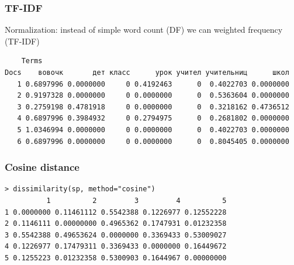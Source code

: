 \documentclass[svgnames]{beamer}
\begin{document}
\begin{frame}[fragile]
  \frametitle{TF-IDF}
  Normalization: instead of simple word count (DF) we can weighted frequency  (TF-IDF)
  \footnotesize
\begin{verbatim}
    Terms
Docs    вовочк       дет класс      урок учител учительниц      школ
   1 0.6897996 0.0000000     0 0.4192463      0  0.4022703 0.0000000
   2 0.9197328 0.0000000     0 0.0000000      0  0.5363604 0.0000000
   3 0.2759198 0.4781918     0 0.0000000      0  0.3218162 0.4736512
   4 0.6897996 0.3984932     0 0.2794975      0  0.2681802 0.0000000
   5 1.0346994 0.0000000     0 0.0000000      0  0.4022703 0.0000000
   6 0.6897996 0.0000000     0 0.0000000      0  0.8045405 0.0000000
\end{verbatim}
\end{frame}

\begin{frame}[fragile]
  \frametitle{Cosine distance}

  \footnotesize
\begin{verbatim}
> dissimilarity(sp, method="cosine")
          1          2         3         4          5
1 0.0000000 0.11461112 0.5542388 0.1226977 0.12552228
2 0.1146111 0.00000000 0.4965362 0.1747931 0.01232358
3 0.5542388 0.49653624 0.0000000 0.3369433 0.53009027
4 0.1226977 0.17479311 0.3369433 0.0000000 0.16449672
5 0.1255223 0.01232358 0.5300903 0.1644967 0.00000000
\end{verbatim}


\end{frame}
\end{document}
